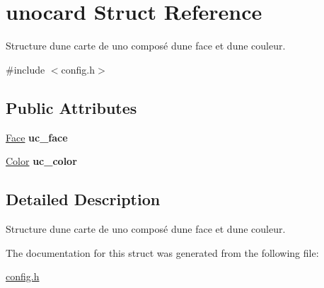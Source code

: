 \hypertarget{structunocard}{}\section{unocard Struct Reference}
\label{structunocard}


Structure d\textquotesingle{}une carte de uno composé d\textquotesingle{}une face et d\textquotesingle{}une couleur.  




{\ttfamily \#include $<$config.\+h$>$}

\subsection*{Public Attributes}
\begin{DoxyCompactItemize}
\item 
\mbox{\label{structunocard_aa9c84cf6eec4f7a2018827449c0943da}} 
\mbox{\hyperlink{config_8h_a80484981734e6c1484093a9f037e79c7}{Face}} {\bfseries uc\+\_\+face}
\item 
\mbox{\label{structunocard_a1310b23caad6c91818bd4cda96218e04}} 
\mbox{\hyperlink{config_8h_af03b271da9a2fa2b56bab917f69c0808}{Color}} {\bfseries uc\+\_\+color}
\end{DoxyCompactItemize}


\subsection{Detailed Description}
Structure d\textquotesingle{}une carte de uno composé d\textquotesingle{}une face et d\textquotesingle{}une couleur. 



The documentation for this struct was generated from the following file\+:\begin{DoxyCompactItemize}
\item 
\mbox{\hyperlink{config_8h}{config.\+h}}\end{DoxyCompactItemize}
